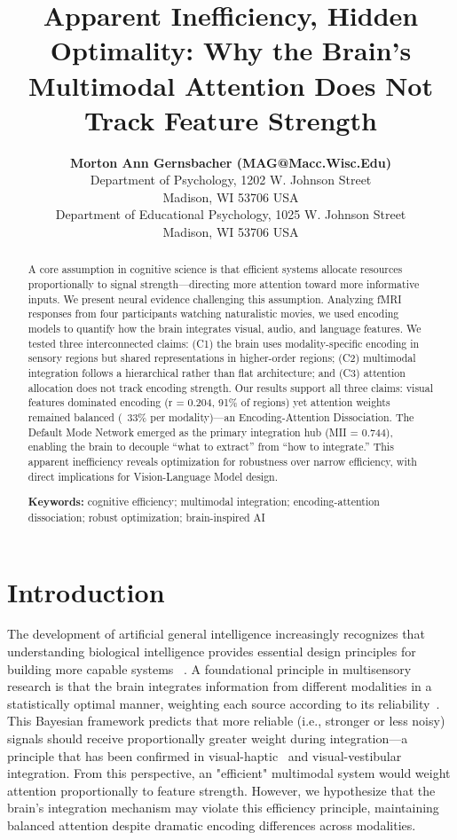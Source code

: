\documentclass[10pt,letterpaper]{article}
\title{Apparent Inefficiency, Hidden Optimality: Why the Brain's Multimodal Attention Does Not Track Feature Strength}
\author{{\large \bf Morton Ann Gernsbacher (MAG@Macc.Wisc.Edu)} \\
  Department of Psychology, 1202 W. Johnson Street \\
  Madison, WI 53706 USA
  \AND {\large \bf Sharon J.~Derry (SDJ@Macc.Wisc.Edu)} \\
  Department of Educational Psychology, 1025 W. Johnson Street \\
  Madison, WI 53706 USA}
\begin{document}
\maketitle


\begin{abstract}
A core assumption in cognitive science is that efficient systems allocate resources proportionally to signal strength—directing more attention toward more informative inputs. We present neural evidence challenging this assumption. Analyzing fMRI responses from four participants watching naturalistic movies, we used encoding models to quantify how the brain integrates visual, audio, and language features. We tested three interconnected claims: (C1) the brain uses modality-specific encoding in sensory regions but shared representations in higher-order regions; (C2) multimodal integration follows a hierarchical rather than flat architecture; and (C3) attention allocation does not track encoding strength. Our results support all three claims: visual features dominated encoding (r = 0.204, 91\% of regions) yet attention weights remained balanced (~33\% per modality)—an Encoding-Attention Dissociation. The Default Mode Network emerged as the primary integration hub (MII = 0.744), enabling the brain to decouple “what to extract” from “how to integrate.” This apparent inefficiency reveals optimization for robustness over narrow efficiency, with direct implications for Vision-Language Model design.

\textbf{Keywords:} cognitive efficiency; multimodal integration; encoding-attention dissociation; robust optimization; brain-inspired AI 
\end{abstract}


\section{Introduction}

The development of artificial general intelligence increasingly recognizes that understanding biological intelligence provides essential design principles for building more capable systems ~\citep{hassabis2017neuroscience,zador2023catalyzing}. {\color{red}A foundational principle in multisensory research is that the brain integrates information from different modalities in a statistically optimal manner, weighting each source according to its reliability~\citep{ernst2002humans,knill2004bayesian}. This Bayesian framework predicts that more reliable (i.e., stronger or less noisy) signals should receive proportionally greater weight during integration—a principle that has been confirmed in visual-haptic~\citep{ernst2002humans} and visual-vestibular~\citep{fetsch2013bridging} integration.} From this perspective, an "efficient" multimodal system would weight attention proportionally to feature strength. However, we hypothesize that the brain's integration mechanism may violate this efficiency principle, maintaining balanced attention despite dramatic encoding differences across modalities.
\end{document}
